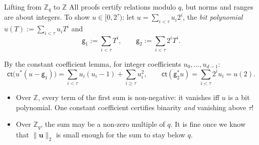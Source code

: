 \documentclass{zkdl-presentation-template}
\begin{document}
    \begin{frame}{Lifting from $\mathbb{Z}_q$ to $\mathbb{Z}$}
        All proofs certify relations modulo $q$, but norms and ranges are about integers. To show $u \in [0,2^{\tau})$: let $u = \sum_{i<\tau} u_i2^i$, the \emph{bit polynomial} $u(T) := \sum_{i<\tau} u_iT^i$ and
        \begin{equation*}
            \mathsf{g}_1 := \sum_{i<\tau} T^i, \qquad \mathsf{g}_2 := \sum_{i<\tau} 2^iT^i.
        \end{equation*}
        \pause
        \vspace{-10pt}

        By the constant coefficient lemma, for integer coefficients $u_0, \dots, u_{d-1}$:
        \begin{equation*}
            \mathsf{ct}\bigl(u^{\ast}(u - \mathsf{g}_1)\bigr) = \sum_{i < \tau} u_i(u_i - 1) + \sum_{i \geq \tau} u_i^2, \qquad \mathsf{ct}(\mathsf{g}_2^{\ast}u) = \sum_{i<\tau} 2^iu_i = u(2).
        \end{equation*}
        \pause
        \vspace{-10pt}

        \begin{itemize}
            \item Over $\mathbb{Z}$, every term of the first sum is non-negative: it vanishes iff $u$ is a bit polynomial. One constant coefficient certifies binarity \emph{and} vanishing above $\tau$!\pause
            \item Over $\mathbb{Z}_q$, the sum may be a non-zero multiple of $q$. It is fine once we know that $\|\mathbf{u}\|_2$ is small enough for the sum to stay below $q$.
        \end{itemize}
    \end{frame}
\end{document}
